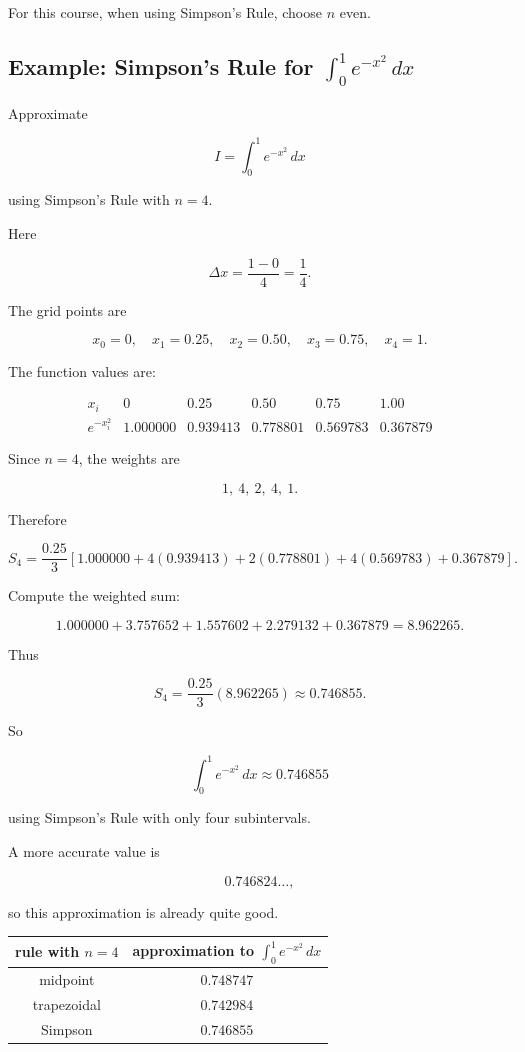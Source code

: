 For this course, when using Simpson's Rule, choose \(n\) even.

\subsection{Example: Simpson's Rule for \texorpdfstring{\(\int_0^1 e^{-x^2}\,dx\)}{int_0^1 e^{-x^2} dx}}
\label{subsec:simpson-example-e-minus-x-squared}

Approximate

\[
I=\int_0^1 e^{-x^2}\,dx
\]

using Simpson's Rule with \(n=4\).

Here

\[
\Delta x=\frac{1-0}{4}=\frac14.
\]

The grid points are

\[
x_0=0,\quad x_1=0.25,\quad x_2=0.50,\quad x_3=0.75,\quad x_4=1.
\]

The function values are:

\[
\begin{array}{c|ccccc}
x_i & 0 & 0.25 & 0.50 & 0.75 & 1.00 \\ \hline
e^{-x_i^2} & 1.000000 & 0.939413 & 0.778801 & 0.569783 & 0.367879
\end{array}
\]

Since \(n=4\), the weights are

\[
1,\ 4,\ 2,\ 4,\ 1.
\]

Therefore

\[
S_4
=
\frac{0.25}{3}
\left[
1.000000
+4(0.939413)
+2(0.778801)
+4(0.569783)
+0.367879
\right].
\]

Compute the weighted sum:

\[
1.000000
+3.757652
+1.557602
+2.279132
+0.367879
=
8.962265.
\]

Thus

\[
S_4=\frac{0.25}{3}(8.962265)\approx 0.746855.
\]

So

\[
\boxed{
\int_0^1 e^{-x^2}\,dx\approx 0.746855
}
\]

using Simpson's Rule with only four subintervals.

A more accurate value is

\[
0.746824\ldots,
\]

so this approximation is already quite good.

\begin{center}
\begin{tabular}{c|c}
\textbf{rule with \(n=4\)} & \textbf{approximation to \(\int_0^1 e^{-x^2}\,dx\)} \\ \hline
midpoint & \(0.748747\) \\
trapezoidal & \(0.742984\) \\
Simpson & \(0.746855\)
\end{tabular}
\end{center}

